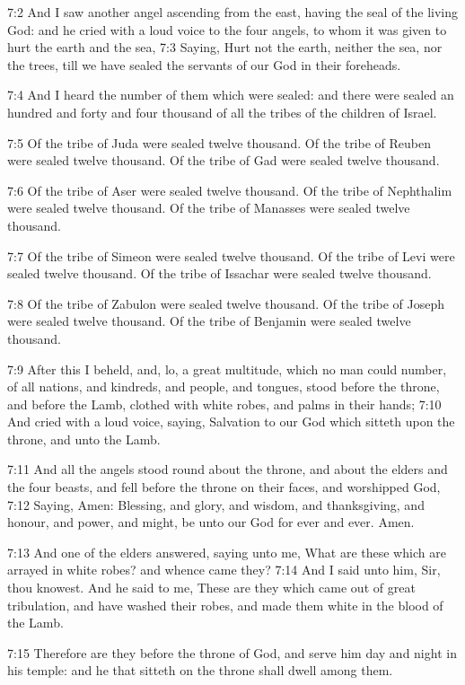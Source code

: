 7:2 And I saw another angel ascending from the east, having the seal
of the living God: and he cried with a loud voice to the four angels,
to whom it was given to hurt the earth and the sea, 7:3 Saying, Hurt
not the earth, neither the sea, nor the trees, till we have sealed the
servants of our God in their foreheads.

7:4 And I heard the number of them which were sealed: and there were
sealed an hundred and forty and four thousand of all the tribes of the
children of Israel.

7:5 Of the tribe of Juda were sealed twelve thousand. Of the tribe of
Reuben were sealed twelve thousand. Of the tribe of Gad were sealed
twelve thousand.

7:6 Of the tribe of Aser were sealed twelve thousand. Of the tribe of
Nephthalim were sealed twelve thousand. Of the tribe of Manasses were
sealed twelve thousand.

7:7 Of the tribe of Simeon were sealed twelve thousand. Of the tribe
of Levi were sealed twelve thousand. Of the tribe of Issachar were
sealed twelve thousand.

7:8 Of the tribe of Zabulon were sealed twelve thousand. Of the tribe
of Joseph were sealed twelve thousand. Of the tribe of Benjamin were
sealed twelve thousand.

7:9 After this I beheld, and, lo, a great multitude, which no man
could number, of all nations, and kindreds, and people, and tongues,
stood before the throne, and before the Lamb, clothed with white
robes, and palms in their hands; 7:10 And cried with a loud voice,
saying, Salvation to our God which sitteth upon the throne, and unto
the Lamb.

7:11 And all the angels stood round about the throne, and about the
elders and the four beasts, and fell before the throne on their faces,
and worshipped God, 7:12 Saying, Amen: Blessing, and glory, and
wisdom, and thanksgiving, and honour, and power, and might, be unto
our God for ever and ever. Amen.

7:13 And one of the elders answered, saying unto me, What are these
which are arrayed in white robes? and whence came they?  7:14 And I
said unto him, Sir, thou knowest. And he said to me, These are they
which came out of great tribulation, and have washed their robes, and
made them white in the blood of the Lamb.

7:15 Therefore are they before the throne of God, and serve him day
and night in his temple: and he that sitteth on the throne shall dwell
among them.

